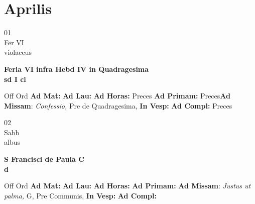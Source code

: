 \documentclass[10pt, openany]{book}
\begin{document}
    \chapter{Aprilis}
                    
    \begin{center}
        \begin{minipage}{3.5in}
            \vspace{2em}
            \begin{minipage}{0.5in}
                {\Huge 01} \\
                {\normalsize Fer VI} \\
                {\normalsize violaceus}
            \end{minipage}
            \begin{minipage}{3.0in}
                \textbf{ \large Feria VI infra Hebd IV in Quadragesima  \\
                \textnormal{\normalsize sd I cl}} \\ 
            \end{minipage}
            \begin{justify}Off Ord
                \textbf{Ad Mat: }
                \textbf{Ad Lau: }
                \textbf{Ad Horas: }Preces
                \textbf{Ad Primam: }Preces\textbf{Ad Missam}: \textit{Confessio,} Pre de Quadragesima,  
                \textbf{In Vesp: }
                \textbf{Ad Compl: }Preces
            \end{justify}
        \end{minipage}
    \end{center}

    \begin{center}
        \begin{minipage}{3.5in}
            \vspace{2em}
            \begin{minipage}{0.5in}
                {\Huge 02} \\
                {\normalsize Sabb} \\
                {\normalsize albus}
            \end{minipage}
            \begin{minipage}{3.0in}
                \textbf{ \large S Francisci de Paula C \\
                \textnormal{\normalsize d}} \\ 
            \end{minipage}
            \begin{justify}Off Ord
                \textbf{Ad Mat: }
                \textbf{Ad Lau: }
                \textbf{Ad Horas: }
                \textbf{Ad Primam: }\textbf{Ad Missam}: \textit{Justus ut palma,} G, Pre Communis,  
                \textbf{In Vesp: }
                \textbf{Ad Compl: }
            \end{justify}
        \end{minipage}
    \end{center}
\end{document}
